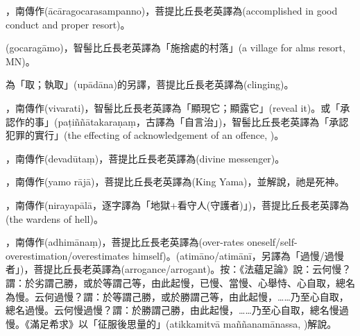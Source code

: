 \startitemgroup[noteitems]
\item{}，南傳作(ācāragocarasampanno)，菩提比丘長老英譯為(accomplished in good conduct and proper resort)。
\item{}(gocaragāmo)，智髻比丘長老英譯為「施捨處的村落」(a village for alms resort, MN)。
\stopitemgroup

\startitemgroup[noteitems]
\item{}為「取；執取」(upādāna)的另譯，菩提比丘長老英譯為(clinging)。
\stopitemgroup

\startitemgroup[noteitems]
\item{}，南傳作(vivarati)，智髻比丘長老英譯為「顯現它；顯露它」(reveal it)。或「承認作的事」(paṭiññātakaraṇaṃ，古譯為「自言治」)，智髻比丘長老英譯為「承認犯罪的實行」(the effecting of acknowledgement of an offence, )。
\stopitemgroup

\startitemgroup[noteitems]
\item{}，南傳作(devadūtaṃ)，菩提比丘長老英譯為(divine messenger)。
\item{}，南傳作(yamo rājā)，菩提比丘長老英譯為(King Yama)，並解說，祂是死神。
\item{}，南傳作(nirayapālā，逐字譯為「地獄+看守人(守護者)」)，菩提比丘長老英譯為(the wardens of hell)。
\stopitemgroup

\startitemgroup[noteitems]
\item{}，南傳作(adhimānaṃ)，菩提比丘長老英譯為(over-rates oneself/self-overestimation/overestimates himself)。(atimāno/atimānī，另譯為「過慢/過慢者」)，菩提比丘長老英譯為(arrogance/arrogant)。按：《法蘊足論》說：云何慢？謂：於劣謂己勝，或於等謂己等，由此起慢，已慢、當慢、心舉恃、心自取，總名為慢。云何過慢？謂：於等謂己勝，或於勝謂己等，由此起慢，……乃至心自取，總名過慢。云何慢過慢？謂：於勝謂己勝，由此起慢，……乃至心自取，總名慢過慢。《滿足希求》以「征服後思量的」(atikkamitvā maññanamānassa, )解說。
\stopitemgroup

